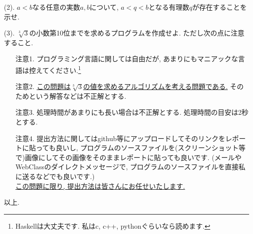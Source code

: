 \documentclass[dvipdfmx,a4paper,11pt]{article}
\newcommand{\R}{\mathbb{R}}
\theoremstyle{definition}
\newcommand{\pdrv}[2]{\frac{\partial #1}{\partial #2}}
\begin{document}
\vspace{11pt}
 
(2). $a<b$なる任意の実数$a,b$について, $a<q<b$となる有理数$q$が存在することを示せ.

\vspace{11pt}

(3). $\sqrt[3]{3}$の小数第10位までを求めるプログラムを作成せよ.
ただし次の点に注意すること.
\begin{enumerate}
\item[注意1.] プログラミング言語に関しては自由だが, あまりにもマニアックな言語は控えてください.\footnote{Haskellは大丈夫です. 私はc, c++, pythonぐらいなら読めます.}
\item[注意2.] \underline{この問題は$\sqrt[3]{3}$の値を求めるアルゴリズムを考える問題である.}
そのためという解答などは不正解とする.
\item[注意3.] 処理時間があまりにも長い場合は不正解とする. 処理時間の目安は2秒とする.
\item[注意4.] 提出方法に関してはgithub等にアップロードしてそのリンクをレポートに貼っても良いし, プログラムのソースファイルを(スクリーンショット等で)画像にしてその画像をそのままレポートに貼っても良いです. (メールやWebClassのダイレクトメッセージで, プログラムのソースファイルを直接私に送るなどでも良いです.) \\
 \underline{この問題に限り, 提出方法は皆さんにお任せいたします. }
\end{enumerate}


     \vspace{33pt} 
     
 \begin{flushright}
 {\LARGE 以上.}
 \end{flushright}




  

 
\end{document}
